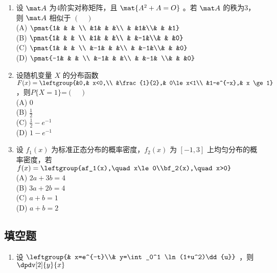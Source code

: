 \begin{enumerate}
\item 设 $\mat A$ 为4阶实对称矩阵，且 $\mat {A^2+A=O}$  。若 $\mat A$ 的秩为3，则 $\mat A$  相似于 $(\quad )$\\
(A) $\pmat{1& & &  \\ &1& & &\\ & &1&\\& & &1}$\\
(B) $\pmat{1& & &  \\ &1& & &\\ & &-1&\\& & &0}$\\
(C) $\pmat{1& & &  \\ &-1& & &\\ & &-1&\\& & &0}$\\
(D) $\pmat{-1& & & \\ &-1& & &\\ & &-1& \\& & &0}$
\item  设随机变量 $X$ 的分布函数 $F(x)=\leftgroup{&0,& x<0,\\ &\frac{1}{2},& 0\le x<1\\ &1-e^{-x},& x \ge 1}$   ，则$P\{X=1\}$=$(\quad )$\\
(A)  $0$\\
(B) $\frac{1}{2}$\\
(C)  $\frac{1}{2}-e^{-1}$\\
(D) $1-e^{-1}$
\item  设 $f_1(x)$ 为标准正态分布的概率密度，$f_2(x)$   为 $[-1,3]$ 上均匀分布的概率密度，若 $f(x)=\leftgroup{af_1(x),\quad x\le0\\bf_2(x),\quad x>0}$\\
(A) $2a+3b=4$\\
(B)   $3a+2b=4$\\
(C)  $a+b=1$\\
(D)   $a+b=2$
\end{enumerate}
\subsection{填空题}
\begin{enumerate}
\item 设 $\leftgroup{& x=e^{-t}\\& y=\int_0^1 \ln(1+u^2)\dd{u}}$   ，则 $\dpdv[2]{y}{x}$
\end{enumerate}